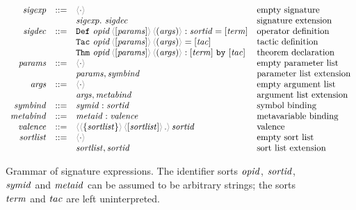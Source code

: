 \documentclass{article}
\begin{document}
\begin{figure}[h]
  \begin{displaymath}
    \begin{array}{rcll}
       \SortSigExpr & ::=
         & \EmptySig & \text{empty signature}\\
         && \ExtendSig{\SortSigExpr}{\SortSigDecl} & \text{signature extension}\\
       \SortSigDecl & ::=
         & \DefDecl{\SortOpId}{\SortParams}{\SortArgs}{\SortSortId}{\SortTerm} & \text{operator definition}\\
         && \TacDecl{\SortOpId}{\SortParams}{\SortArgs}{\SortTac} & \text{tactic definition}\\
         && \ThmDecl{\SortOpId}{\SortParams}{\SortArgs}{\SortTerm}{\SortTac} & \text{theorem declaration}\\
       \SortParams & ::=
         & \EmptyCtx & \text{empty parameter list}\\
         && \ExtendCtx{\SortParams}{\SortSymBind} & \text{parameter list extension}\\
       \SortArgs & ::=
         & \EmptyCtx & \text{empty argument list}\\
         && \ExtendCtx{\SortArgs}{\SortMetaBind}  & \text{argument list extension}\\
       \SortSymBind & ::=
         & \Bind{\SortSymId}{\SortSortId} & \text{symbol binding}\\
       \SortMetaBind & ::=
         & \Bind{\SortMetaId}{\SortValence} & \text{metavariable binding}\\
       \SortValence & ::=
         & \MkValence{\SortSortList}{\SortSortList}{\SortSortId} & \text{valence}\\
       \SortSortList & ::=
         & \EmptyCtx & \text{empty sort list}\\
         && \ExtendCtx{\SortSortList}{\SortSortId} & \text{sort list extension}
     \end{array}
  \end{displaymath}

  \caption{%
    Grammar of signature expressions. The identifier sorts $\mathit{opid}$,
    $\mathit{sortid}$, $\mathit{symid}$ and $\mathit{metaid}$ can be assumed to be arbitrary
    strings; the sorts $\mathit{term}$ and $\mathit{tac}$ are left uninterpreted.%
  }
  \label{fig:grammar}
\end{figure}
\end{document}
